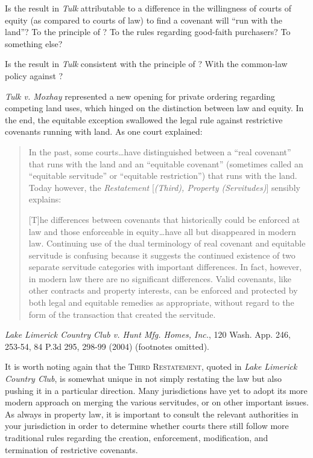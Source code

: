 
\item Is the result in \textit{Tulk} attributable to a difference in the
willingness of courts of equity (as compared to courts of law) to find a
covenant will ``run with the land''? To the principle of
\textit{}? To
the rules regarding good-faith purchasers? To something else?


\item Is the result in \textit{Tulk} consistent with the principle of
\textit{}? With the common-law policy against
?

\item \textit{Tulk v. Moxhay} represented a new opening for private ordering
regarding competing land uses, which hinged on the distinction between law and
equity. In the end, the equitable exception swallowed the legal rule against
restrictive covenants running with land. As one court explained:
\begin{quotation}
In the past, some courts\ldots have distinguished between a ``real covenant''
that runs with the land and an ``equitable covenant'' (sometimes called an
``equitable servitude'' or ``equitable restriction'') that runs with the land.
Today however, the \textit{Restatement} [\textit{(Third), Property
(Servitudes)}] sensibly explains:

[T]he differences between covenants that historically could be enforced at law
and those enforceable in equity\ldots have all but disappeared in modern law.
Continuing use of the dual terminology of real covenant and equitable servitude
is confusing because it suggests the continued existence of two separate
servitude categories with important differences. In fact, however, in modern law
there are no significant differences. Valid covenants, like other contracts and
property interests, can be enforced and protected by both legal and equitable
remedies as appropriate, without regard to the form of the transaction that
created the servitude.
\end{quotation}
\emph{Lake Limerick Country Club v. Hunt Mfg. Homes, Inc.}, 120 Wash. App. 246,
253-54, 84 P.3d 295, 298-99 (2004) (footnotes omitted).

\item It is worth noting again that the \textsc{Third Restatement}, quoted in
\textit{Lake Limerick Country Club}, is somewhat unique in not simply restating
the law but also pushing it in a particular direction. Many jurisdictions have
yet to adopt its more modern approach on merging the various servitudes, or on
other important issues. As always in property law, it is important to consult
the relevant authorities in your jurisdiction in order to determine whether
courts there still follow more traditional rules regarding the creation,
enforcement, modification, and termination of restrictive covenants.

